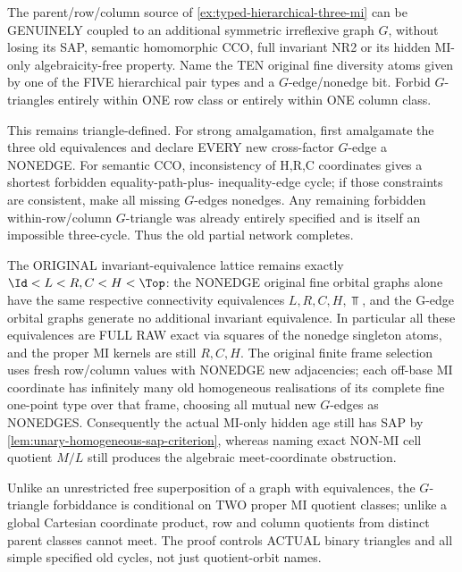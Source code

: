 \begin{remark}
\label{rem:typed-hierarchical-graph-mi}
The parent/row/column source of
\cref{ex:typed-hierarchical-three-mi}
can be GENUINELY coupled to an
additional symmetric irreflexive
graph $G$, without losing its
SAP, semantic homomorphic CCO,
full invariant NR2 or its hidden
MI-only algebraicity-free
property. Name the TEN original
fine diversity atoms given by
one of the FIVE hierarchical
pair types and a $G$-edge/nonedge
bit. Forbid $G$-triangles entirely
within ONE row class or entirely
within ONE column class.

This remains triangle-defined.
For strong amalgamation, first
amalgamate the three old
equivalences and declare EVERY
new cross-factor $G$-edge a
NONEDGE. For semantic CCO,
inconsistency of H,R,C
coordinates gives a shortest
forbidden equality-path-plus-
inequality-edge cycle; if those
constraints are consistent, make
all missing $G$-edges nonedges.
Any remaining forbidden
within-row/column $G$-triangle
was already entirely specified
and is itself an impossible
three-cycle. Thus the old partial
network completes.

The ORIGINAL invariant-equivalence
lattice remains exactly
$\Id<L<R,C<H<\Top$:
the NONEDGE original fine
orbital graphs alone have the
same respective connectivity
equivalences $L,R,C,H,\Top$,
and the G-edge orbital graphs
generate no additional invariant
equivalence. In particular all
these equivalences are FULL RAW
exact via squares of the
nonedge singleton atoms,
and the proper MI kernels
are still $R,C,H$.
The original finite frame
selection uses fresh row/column
values with NONEDGE new
adjacencies; each off-base
MI coordinate has infinitely
many old homogeneous
realisations of its complete
fine one-point type over that
frame, choosing all mutual
new $G$-edges as NONEDGES.
Consequently the actual MI-only
hidden age still has SAP by
\cref{lem:unary-homogeneous-sap-criterion},
whereas naming exact NON-MI
cell quotient $M/L$ still
produces the algebraic
meet-coordinate obstruction.

Unlike an unrestricted free
superposition of a graph with
equivalences, the $G$-triangle
forbiddance is conditional on
TWO proper MI quotient classes;
unlike a global Cartesian
coordinate product, row and
column quotients from distinct
parent classes cannot meet.
The proof controls ACTUAL
binary triangles and all simple
specified old cycles, not just
quotient-orbit names.
\end{remark}

